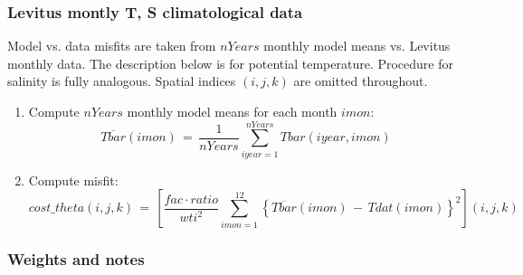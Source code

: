 \subsubsection{Levitus montly T, S climatological data}

Model vs. data misfits are taken from $nYears$ monthly model means
vs. Levitus monthly data.
The description below is for potential temperature.
Procedure for salinity is fully analogous.
Spatial indices $(i,j,k)$ are omitted throughout.
%
\begin{enumerate}
%
\item
Compute $nYears$ monthly model means for each month $imon$:
\[
\overline{Tbar}(imon) \, = \, \frac{1}{nYears} 
\sum_{iyear=1}^{nYears} Tbar(iyear,imon)
\]
%
\item
Compute misfit:
\[
cost\_theta(i,j,k) \, = \, \left[ 
\frac{fac \cdot ratio}{wti^2} \sum_{imon=1}^{12}
\left\{ \overline{Tbar}(imon) \, - \, Tdat(imon) \right\}^2  \right] (i,j,k)
\]

\end{enumerate}


\subsubsection{Weights and notes}

